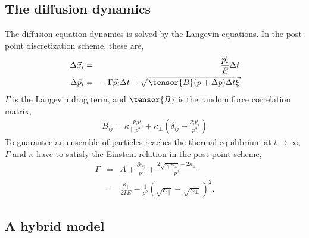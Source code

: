 \documentclass[aps, prc, reprint, amsmath, groupedaddress, nofootinbib]{revtex4-1}
\newcommand{\Kpara}{\kappa_{\|}}
\newcommand{\Kperp}{\kappa_{\perp}}
\begin{document}
\subsection{The diffusion dynamics}
The diffusion equation dynamics is solved by the Langevin equations.
In the post-point discretization scheme, these are,
\begin{eqnarray}
\Delta \vec{x}_i &=& \frac{\vec{p}_i}{E} \Delta t	\\
\Delta \vec{p}_i &=& -\Gamma \vec{p}_i \Delta t + \sqrt{\tensor{B}(p+\Delta p) \Delta t  }\vec{\xi}
\end{eqnarray}
$\Gamma$ is the Langevin drag term, and $\tensor{B}$ is the random force correlation matrix,
\begin{eqnarray}
B_{ij} = \Kpara \frac{p_i p_j}{p^2} + \Kperp \left(\delta_{ij} - \frac{p_i p_j}{p^2}\right)
\end{eqnarray}
To guarantee an ensemble of particles reaches the thermal equilibrium at $t\rightarrow \infty$, $\Gamma$ and $\kappa$ have to satisfy the Einstein relation in the post-point scheme,
\begin{eqnarray}
\Gamma &=& A + \frac{\partial \Kpara}{p^2} + \frac{2\sqrt{\Kpara\Kperp} - 2\Kperp}{p^2} \\
 &=& \frac{\Kpara}{2TE} - \frac{1}{p^2}\left( \sqrt{\Kpara} - \sqrt{\Kperp} \right)^2.
\end{eqnarray}

\subsection{A hybrid model}
\end{document}
